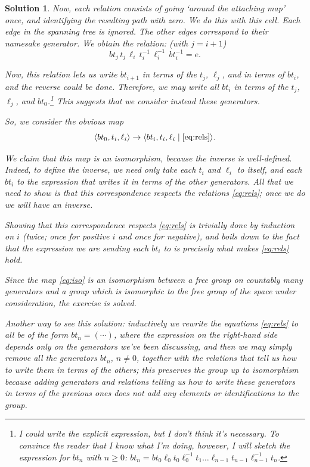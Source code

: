 \documentclass{article}
\theoremstyle{plain}
\theoremstyle{nonumberplain}
\newtheorem{sol}{Solution}
\DeclarePairedDelimiter{\braket}{\langle}{\rangle}
\begin{document}
\begin{sol}
Now, each relation consists of going `around the attaching map' once, and identifying the resulting path with zero. We do this with this cell. Each edge in the spanning tree is ignored. The other edges correspond to their namesake generator. We obtain the relation: (with $j = i+1$)
\begin{equation} \label{eq:rels}
bt_j \, t_j \, \ell_i \, t_i^{-1} \, \ell_i^{-1} \, bt_i^{-1} = e.
\end{equation}

Now, this relation lets us write $bt_{i+1}$ in terms of the $t_j$, $\ell_j$, and in terms of $bt_i$, and the reverse could be done. Therefore, \emph{we may write all $bt_i$ in terms of the $t_j$, $\ell_j$, and $bt_0$}.\footnote{I could write the explicit expression, but I don't think it's necessary. To convince the reader that I know what I'm doing, however, I will sketch the expression for $bt_n$ with $n \geq 0$: $bt_n = bt_0 \ell_0 t_0 \ell_0^{-1} t_1 \dots \ell_{n-1} t_{n-1} \ell_{n-1}^{-1} t_n$.} This suggests that we consider instead these generators.

So, we consider the obvious map
\begin{equation}\label{eq:iso}
\braket{bt_0, t_i, \ell_i} \to \braket{bt_i, t_i, \ell_i \mid \eqref{eq:rels}}.
\end{equation}

We claim that this map is an isomorphism, because the inverse is well-defined. Indeed, to define the inverse, we need only take each $t_i$ and $\ell_i$ to itself, and each $bt_i$ to the expression that writes it in terms of the other generators. All that we need to show is that this correspondence respects the relations \eqref{eq:rels}; once we do we will have an inverse.

Showing that this correspondence respects \eqref{eq:rels} is trivially done by induction on $i$ (twice; once for positive $i$ and once for negative), and boils down to the fact that the expression we are sending each $bt_i$ to is precisely what makes \eqref{eq:rels} hold.

Since the map \eqref{eq:iso} is an isomorphism between a free group on countably many generators and a group which is isomorphic to the free group of the space under consideration, the exercise is solved.

\smallskip

Another way to see this solution: inductively we rewrite the equations \eqref{eq:rels} to all be of the form $bt_n = (\cdots)$, where the expression on the right-hand side depends only on the generators we've been discussing, and then we may simply remove all the generators $bt_n$, $n \neq 0$, together with the relations that tell us how to write them in terms of the others; this preserves the group up to isomorphism because adding generators and relations telling us how to write these generators in terms of the previous ones does not add any elements or identifications to the group.
\end{sol}
\end{document}
